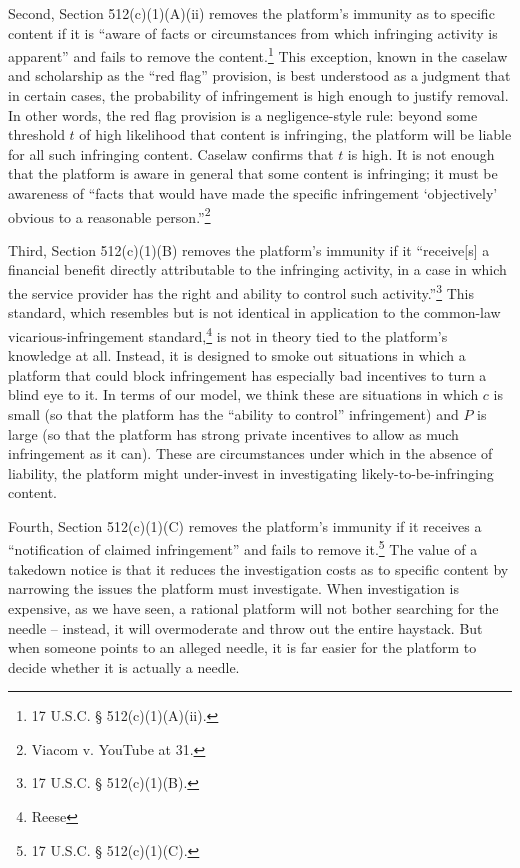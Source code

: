 Second, Section 512(c)(1)(A)(ii) removes the platform's immunity as to specific content if it is ``aware of facts or circumstances from which infringing activity is apparent'' and fails to remove the content.\footnote{17 U.S.C. § 512(c)(1)(A)(ii).} This exception, known in the caselaw and scholarship as the ``red flag'' provision, is best understood as a judgment that in certain cases, the probability of infringement is high enough to justify removal. In other words, the red flag provision is a negligence-style rule: beyond some threshold $t$ of high likelihood that content is infringing, the platform will be liable for all such infringing content. Caselaw confirms that $t$ is high. It is not enough that the platform is aware in general that some content is infringing; it must be awareness of ``facts that would have made the specific infringement `objectively' obvious to a reasonable person.''\footnote{Viacom v. YouTube at 31.} 

Third, Section 512(c)(1)(B) removes the platform's immunity if it ``receive[s] a financial benefit directly attributable to the infringing activity, in a case in which the service provider has the right and ability to control such activity.''\footnote{17 U.S.C. § 512(c)(1)(B).} This standard, which resembles but is not identical in application to the common-law vicarious-infringement standard,\footnote{Reese} is not in theory tied to the platform's knowledge at all. Instead, it is designed to smoke out situations in which a platform that could block infringement has especially bad incentives to turn a blind eye to it. In terms of our model, we think these are situations in which $c$ is small (so that the platform has the ``ability to control'' infringement) and $P$ is large (so that the platform has strong private incentives to allow as much infringement as it can). These are circumstances under which in the absence of liability, the platform might under-invest in investigating likely-to-be-infringing content.

Fourth, Section 512(c)(1)(C) removes the platform's immunity if it receives a ``notification of claimed infringement'' and fails to remove it.\footnote{17 U.S.C. § 512(c)(1)(C).} The value of a takedown notice is that it reduces the investigation costs as to specific content by narrowing the issues the platform must investigate. When investigation is expensive, as we have seen, a rational platform will not bother searching for the needle -- instead, it will overmoderate and throw out the entire haystack. But when someone points to an alleged needle, it is far easier for the platform to decide whether it is actually a needle.


